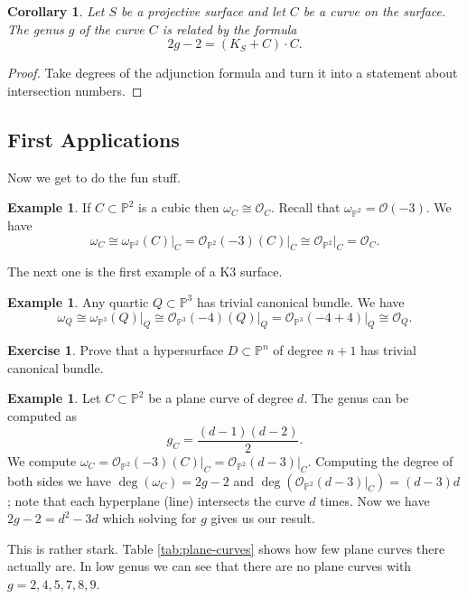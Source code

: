 \documentclass[12pt]{article}
\numberwithin{equation}{section}
\newtheorem{corollary}[theorem]{Corollary}
\theoremstyle{definition}
\newtheorem{example}[theorem]{Example}
\newtheorem{exercise}[theorem]{Exercise}
\theoremstyle{remark}
\newcommand{\Ocal}{\mathcal{O}}
\newcommand{\PP}{\mathbb{P}}
\begin{document}
\begin{corollary}
	Let $S$ be a projective surface and let $C$ be a curve on the surface. 
	The genus $g$ of the curve $C$ is related by the formula
	\begin{equation}
	2g-2 = (K_S+C)\cdot C.
	\end{equation}
\end{corollary}
\begin{proof}
	Take degrees of the adjunction formula and turn it into a statement about intersection numbers.
\end{proof}

\subsection{First Applications}

Now we get to do the fun stuff.
\begin{example}
	If $C\subset \PP^2$ is a cubic then $\omega_C \cong \Ocal_C$.
		Recall that $\omega_{\PP^2}= \Ocal(-3)$. 
	We have 
	$$\omega_C \cong \omega_{\PP^2}(C)\vert_C = \Ocal_{\PP^2}(-3)(C)\vert_C \cong \Ocal_{\PP^2}\vert_C = \Ocal_C.$$
\end{example}

The next one is the first example of a K3 surface.
\begin{example}
	Any quartic $Q\subset \PP^3$ has trivial canonical bundle. 
	We have 
	$$\omega_Q \cong \omega_{\PP^3}(Q)\vert_Q \cong \Ocal_{\PP^3}(-4)(Q)\vert_Q = \Ocal_{\PP^3}(-4+4)\vert_Q \cong \Ocal_Q.$$
\end{example}

\begin{exercise}
	Prove that a hypersurface $D \subset \PP^n$ of degree $n+1$ has trivial canonical bundle.
\end{exercise}

\begin{example}
	Let $C \subset \PP^2$ be a plane curve of degree $d$. 
	The genus can be computed as 
	 $$ g_C = \frac{(d-1)(d-2)}{2}. $$
	We compute $\omega_C = \Ocal_{\PP^2}(-3)(C)\vert_C = \Ocal_{\PP^2}(d-3)\vert_C$. 
	Computing the degree of both sides we have $\deg(\omega_C) = 2g-2$ and $\deg(\Ocal_{\PP^2}(d-3)\vert_C) = (d-3)d$; note that each hyperplane (line) intersects the curve $d$ times. 
	Now we have $2g-2 = d^2-3d$ which solving for $g$ gives us our result. 
\end{example}

This is rather stark. 
Table \ref{tab:plane-curves} shows how few plane curves there actually are. 
In low genus we can see that there are no plane curves with $g=2,4,5,7,8,9$.
\end{document}
